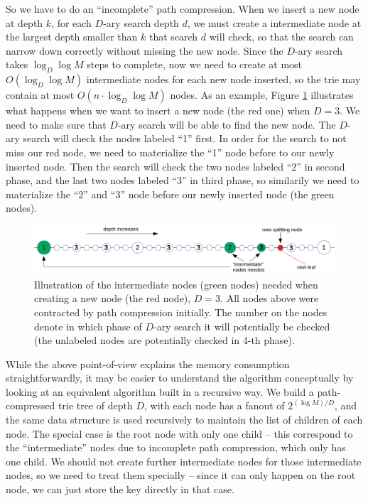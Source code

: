 \documentclass[11pt, usletter]{article}
\begin{document}
So we have to do an ``incomplete'' path compression. 
When we insert a new node at depth $k$,
for each $D$-ary search depth $d$,
we must create a intermediate node at the largest depth smaller than $k$ that search $d$ will check, 
so that the search can narrow down correctly without missing the new node. 
Since the $D$-ary search takes $\log_D\log M$ steps to complete, 
now we need to create at most $O(\log_D\log M)$ intermediate nodes for each new node inserted, 
so the trie may contain at most $O(n\cdot \log_D\log M)$ nodes. 
As an example, Figure \ref{intermediate_nodes} illustrates what happens when we want to insert
a new node (the red one) when $D=3$. 
We need to make sure that $D$-ary search will be able to find the new node. 
The $D$-ary search will check the nodes labeled ``1'' first. 
In order for the search to not miss our red node, we need to materialize the ``1'' node before to our newly inserted node. 
Then the search will check the two nodes labeled ``2'' in second phase, and the last two nodes labeled ``3'' in third phase,
so similarily we need to materialize the ``2'' and ``3'' node before our newly inserted node (the green nodes).

\begin{figure}[!htb]
  \includegraphics[width=\linewidth]{intermediate_nodes.png}
\caption{Illustration of the intermediate nodes (green nodes) needed when creating a new node (the red node), $D=3$. 
All nodes above were contracted by path compression initially.
The number on the nodes denote in which phase of $D$-ary search 
it will potentially be checked (the unlabeled nodes are potentially checked in 4-th phase).}
\label{intermediate_nodes}
\end{figure}

While the above point-of-view explains the memory consumption straightforwardly, 
it may be easier to understand the algorithm conceptually 
by looking at an equivalent algorithm built in a recursive way. 
We build a path-compressed trie tree of depth $D$, with each node has a fanout of $2^{(\log M)/D}$, 
and the same data structure is used recursively to maintain the list of children of each node.
The special case is the root node with only one child -- 
this correspond to the ``intermediate'' nodes due to incomplete path compression, which only has one child. 
We should not create further intermediate nodes for those intermediate nodes, 
so we need to treat them specially -- since it can only happen on the root node, 
we can just store the key directly in that case. 
\end{document}

